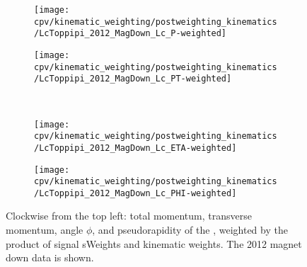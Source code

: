 \begin{figure}
  \begin{subfigure}[b]{0.4\textwidth}
    \texttt{[image: cpv/kinematic\_weighting/postweighting\_kinematics/LcToppipi\_2012\_MagDown\_Lc\_P-weighted]}
    \label{fig:cpv:kinematic_weighting:post:Lc:P}
  \end{subfigure}
  \begin{subfigure}[b]{0.4\textwidth}
    \texttt{[image: cpv/kinematic\_weighting/postweighting\_kinematics/LcToppipi\_2012\_MagDown\_Lc\_PT-weighted]}
    \label{fig:cpv:kinematic_weighting:post:Lc:PT}
  \end{subfigure}\\
  \begin{subfigure}[b]{0.4\textwidth}
    \texttt{[image: cpv/kinematic\_weighting/postweighting\_kinematics/LcToppipi\_2012\_MagDown\_Lc\_ETA-weighted]}
    \label{fig:cpv:kinematic_weighting:post:Lc:ETA}
  \end{subfigure}
  \begin{subfigure}[b]{0.4\textwidth}
    \texttt{[image: cpv/kinematic\_weighting/postweighting\_kinematics/LcToppipi\_2012\_MagDown\_Lc\_PHI-weighted]}
    \label{fig:cpv:kinematic_weighting:post:Lc:PHI}
  \end{subfigure}
  \caption{%
    Clockwise from the top left: total momentum, transverse momentum, angle 
    $\phi$, and pseudorapidity of the \PLambdac, weighted by the product of 
    signal sWeights and kinematic weights.
    The 2012 magnet down data is shown.
  }
  \label{fig:cpv:kinematic_weighting:post:Lc}
\end{figure}

